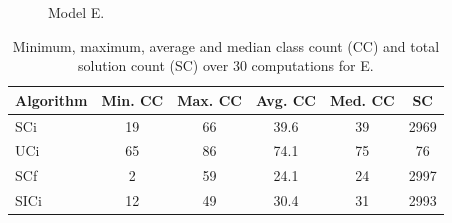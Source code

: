 \documentclass[a4paper, 12pt]{scrartcl}
\begin{document}
\begin{figure}
\centering
{}%
\hfill
{}%
\caption{Model E.}
\end{figure}

\begin{table}%
\centering
\begin{tabular}{lccccc}
Algorithm & Min. CC & Max. CC & Avg. CC & Med. CC & SC\\
\hline
SCi & 19 & 66 & 39.6 & 39 & 2969\\
UCi & 65 & 86 & 74.1 & 75 & 76\\
SCf & 2 & 59 & 24.1 & 24 & 2997\\
SICi & 12 & 49 & 30.4 & 31 & 2993
\end{tabular}
\caption{Minimum, maximum, average and median class count (CC) and total solution count (SC) over 30 computations for E.}
\label{}
\end{table}
\end{document}

